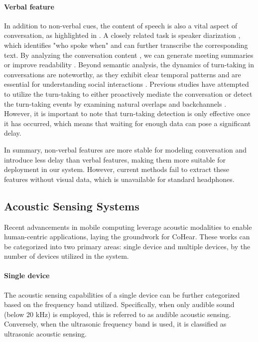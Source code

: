 \paragraph{Verbal feature}
In addition to non-verbal cues, the content of speech is also a vital aspect of conversation, as highlighted in \cite{sacks1974simplest}. A closely related task is speaker diarization \cite{bredin2023pyannote}, which identifies "who spoke when" and can further transcribe the corresponding text. By analyzing the conversation content \cite{wei2022conversational}, we can generate meeting summaries \cite{ramprasad2024analyzing} or improve readability \cite{wang2024diarizationlm}. Beyond semantic analysis, the dynamics of turn-taking in conversations are noteworthy, as they exhibit clear temporal patterns and are essential for understanding social interactions \cite{levinson2015timing}. 
Previous studies have attempted to utilize the turn-taking to either proactively mediate the conversation \cite{lee2018flower} or detect the turn-taking events by examining natural overlaps and backchannels \cite{chen2024target, chang2022turn}. However, it is important to note that turn-taking detection is only effective once it has occurred, which means that waiting for enough data can pose a significant delay. 

In summary, non-verbal features are more stable for modeling conversation and introduce less delay than verbal features, making them more suitable for deployment in our system. However, current methods fail to extract these features without visual data, which is unavailable for standard headphones.


\subsection{Acoustic Sensing Systems}
Recent advancements in mobile computing leverage acoustic modalities to enable human-centric applications, laying the groundwork for CoHear. These works can be categorized into two primary areas: single device and multiple devices, by the number of devices utilized in the system.

\paragraph{Single device}
The acoustic sensing capabilities of a single device can be further categorized based on the frequency band utilized. Specifically, when only audible sound (below 20 kHz) is employed, this is referred to as audible acoustic sensing. Conversely, when the ultrasonic frequency band is used, it is classified as ultrasonic acoustic sensing.

